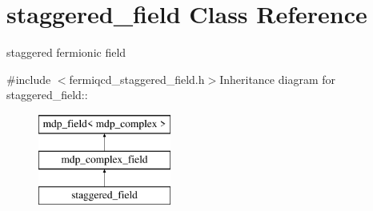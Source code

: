 \hypertarget{classstaggered__field}{
\section{staggered\_\-field Class Reference}
\label{classstaggered__field}
}


staggered fermionic field  


{\ttfamily \#include $<$fermiqcd\_\-staggered\_\-field.h$>$}Inheritance diagram for staggered\_\-field::\begin{figure}[H]
\begin{center}
\leavevmode
\includegraphics[height=3cm]{classstaggered__field}
\end{center}
\end{figure}
